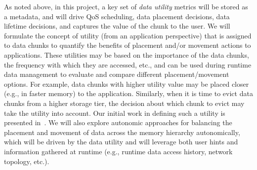 As noted above, in this project, a key set of \textit{data utility} metrics 
will be stored as a metadata, and will drive QoS scheduling, data placement 
decisions, data lifetime decisions, and captures the value of the chunk to
the user. 
We will formulate the concept of utility (from an
application perspective) that is assigned to data chunks to quantify the
benefits of placement and/or movement actions to applications. These
utilities may be based on the importance of the data chunks, the frequency
with which they are accessed, etc., and can be used during runtime data
management to evaluate and compare different placement/movement options. 
For example, data chunks with higher utility value may be
placed closer (e.g., in faster memory) to the application.
Similarly, when it is time to evict data chunks from a higher storage
tier, the decision about which chunk to evict may take the utility into
account. Our initial work in defining such a utility is presented in~\cite{tongipdps15,qiansc15}.
 We will also explore autonomic approaches for balancing the placement and 
 movement of data across the memory hierarchy autonomically, which will be driven 
 by the data utility and will leverage both user hints and information gathered at runtime (e.g., runtime data access
history, network topology, etc.).

%

